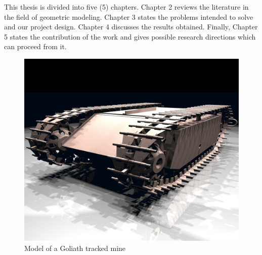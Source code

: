 This thesis is divided into five (5) chapters. Chapter 2 reviews the literature in the field of geometric modeling. Chapter 3 states the problems  intended to solve and our project design. Chapter 4 discusses the results obtained. Finally, Chapter 5 states the contribution of the work and gives possible research directions which can proceed from it.


\begin{figure}[htbp]
\centering
\includegraphics[trim=1cm 2cm 3cm 4cm, clip=true, totalheight=0.5\textheight]{Figures/Goliath.png}
\caption[Model of a Goliath tracked mine]{Model of a Goliath tracked mine}
\label{Goliath}
\end{figure}

